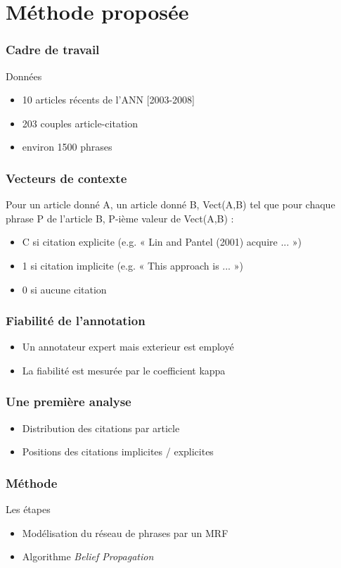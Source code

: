 \documentclass[12pt]{beamer}
\begin{document}
\section{Méthode proposée}

\begin{frame}
  \frametitle{Cadre de travail}
  \begin{block}{Données}
  \begin{itemize}
    \item 10 articles récents de l'ANN [2003-2008]
    \item 203 couples article-citation
    \item environ 1500 phrases
  \end{itemize}
  \end{block}
\end{frame}

\begin{frame}
  \frametitle{Vecteurs de contexte}
  Pour un article donné A, un article donné B,
  Vect(A,B) tel que pour chaque phrase P de l'article B, P-ième valeur de Vect(A,B) :
  \begin{itemize}
    \item C si citation explicite (e.g. « Lin and Pantel (2001) acquire ... »)
    \item 1 si citation implicite (e.g. « This approach is ... »)
    \item 0 si aucune citation
  \end{itemize}
\end{frame}

\begin{frame}
  \frametitle{Fiabilité de l'annotation}
  \begin{itemize}
    \item Un annotateur expert mais exterieur est employé
    \item La fiabilité est mesurée par le coefficient kappa
  \end{itemize}
\end{frame}

\begin{frame}
  \frametitle{Une première analyse}
  \begin{itemize}
    \item Distribution des citations par article
    \item Positions des citations implicites / explicites
  \end{itemize}
\end{frame}

\begin{frame}
  \frametitle{Méthode}
  Les étapes
  \begin{itemize}
    \item Modélisation du réseau de phrases par un MRF
    \item Algorithme \textit{Belief Propagation}
  \end{itemize}
\end{frame}
\end{document}
